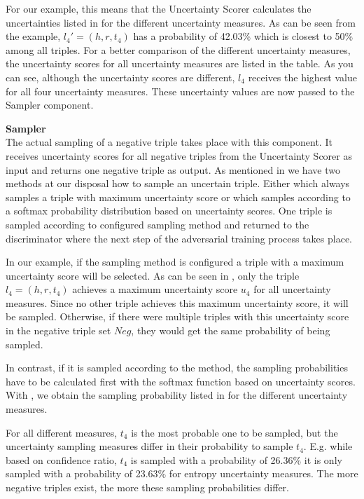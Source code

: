 
For our example, this means that the Uncertainty Scorer calculates the uncertainties listed in  for the different uncertainty measures.
As can be seen from the example, $l_4' = (h, r, t_4)$ has a probability of 42.03\% which is closest to 50\% among all triples.
For a better comparison of the different uncertainty measures, the uncertainty scores for all uncertainty measures are listed in the table.
As you can see, although the uncertainty scores are different, $l_4$ receives the highest value for all four uncertainty measures.
These uncertainty values are now passed to the Sampler component.

\textbf{Sampler} \\
The actual sampling of a negative triple takes place with this component.
It receives uncertainty scores for all negative triples from the Uncertainty Scorer as input and returns one negative triple as output.
As mentioned in  we have two methods at our disposal how to sample an uncertain triple.
Either \usmax which always samples a triple with maximum uncertainty score or \ussoftmax which samples according to a softmax probability distribution based on uncertainty scores.
One triple is sampled according to configured sampling method and returned to the discriminator where the next step of the adversarial training process takes place.


In our example, if the \usmax sampling method is configured a triple with a maximum uncertainty score will be selected.
As can be seen in , only the triple $l_4 = (h,r,t_4)$ achieves a maximum uncertainty score $u_4$ for all uncertainty measures.
Since no other triple achieves this maximum uncertainty score, it will be sampled.
Otherwise, if there were multiple triples with this uncertainty score in the negative triple set $Neg$, they would get the same probability of being sampled.

In contrast, if it is sampled according to the \ussoftmax method, the sampling probabilities have to be calculated first with the softmax function based on uncertainty scores.
With , we obtain the sampling probability listed in  for the different uncertainty measures.

For all different measures, $t_4$ is the most probable one to be sampled, but the uncertainty sampling measures differ in their probability to sample $t_4$.
E.g. while based on confidence ratio, $t_4$ is sampled with a probability of 26.36\% it is only sampled with a probability of 23.63\% for entropy uncertainty measures.
The more negative triples exist, the more these sampling probabilities differ.